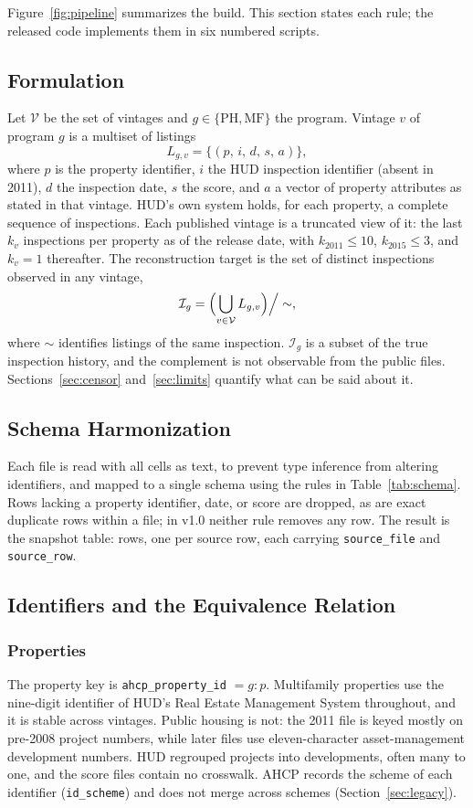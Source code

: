 \documentclass[10pt,twocolumn,letterpaper]{article}
\newcommand{\col}[1]{\texttt{\small #1}}
\begin{document}
Figure~\ref{fig:pipeline} summarizes the build. This section states each rule; the released code implements them in six numbered scripts.

\subsection{Formulation}
Let $\mathcal{V}$ be the set of vintages and $g\in\{\mathrm{PH},\mathrm{MF}\}$ the program. Vintage $v$ of program $g$ is a multiset of listings
\begin{equation}
L_{g,v}=\{(p,\,i,\,d,\,s,\,a)\},
\end{equation}
where $p$ is the property identifier, $i$ the HUD inspection identifier (absent in 2011), $d$ the inspection date, $s$ the score, and $a$ a vector of property attributes as stated in that vintage. HUD's own system holds, for each property, a complete sequence of inspections. Each published vintage is a truncated view of it: the last $k_v$ inspections per property as of the release date, with $k_{2011}\le 10$, $k_{2015}\le 3$, and $k_v=1$ thereafter. The reconstruction target is the set of distinct inspections observed in any vintage,
\begin{equation}
\mathcal{I}_g=\Bigl(\bigcup_{v\in\mathcal{V}} L_{g,v}\Bigr)\Big/\sim,
\end{equation}
where $\sim$ identifies listings of the same inspection. $\mathcal{I}_g$ is a subset of the true inspection history, and the complement is not observable from the public files. Sections~\ref{sec:censor} and~\ref{sec:limits} quantify what can be said about it.

\subsection{Schema Harmonization}
Each file is read with all cells as text, to prevent type inference from altering identifiers, and mapped to a single schema using the rules in Table~\ref{tab:schema}. Rows lacking a property identifier, date, or score are dropped, as are exact duplicate rows within a file; in v1.0 neither rule removes any row. The result is the snapshot table: \SSnapshotRows{} rows, one per source row, each carrying \col{source\_file} and \col{source\_row}.

\subsection{Identifiers and the Equivalence Relation}
\subsubsection{Properties} The property key is \col{ahcp\_property\_id} $=g{:}p$. Multifamily properties use the nine-digit identifier of HUD's Real Estate Management System throughout, and it is stable across vintages. Public housing is not: the 2011 file is keyed mostly on pre-2008 project numbers, while later files use eleven-character asset-management development numbers. HUD regrouped projects into developments, often many to one, and the score files contain no crosswalk. AHCP records the scheme of each identifier (\col{id\_scheme}) and does not merge across schemes (Section~\ref{sec:legacy}).
\end{document}
